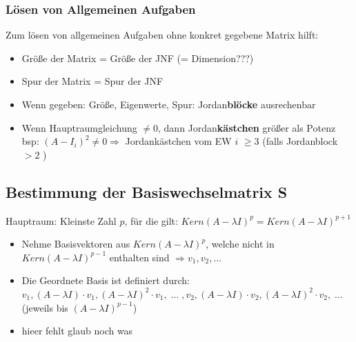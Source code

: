 \documentclass[a4paper,portrait]{scrartcl}
\begin{document}
\subsubsection*{Lösen von Allgemeinen Aufgaben}
Zum lösen von allgemeinen Aufgaben ohne konkret gegebene Matrix hilft:
\begin{itemize}
	\item Größe der Matrix = Größe der JNF (= Dimension???)
	\item Spur der Matrix = Spur der JNF
	\item Wenn gegeben: Größe, Eigenwerte, Spur: Jordan\textbf{blöcke} ausrechenbar
	\item Wenn Hauptraumgleichung $\neq 0$, dann Jordan\textbf{kästchen} größer als Potenz\\
		bsp: $(A-I_i)^2 \neq 0 \Rightarrow$ Jordankästchen vom EW $i$  $\geq 3$ (falls Jordanblock $>2$ )
\end{itemize}
\subsection{Bestimmung der Basiswechselmatrix S}
Hauptraum: Kleinste Zahl $p$, für die gilt: $Kern(A-\lambda I)^p = Kern(A-\lambda I)^{p+1}$\\

\begin{itemize}
	\item Nehme Basisvektoren aus $Kern(A-\lambda I)^p$, welche nicht in  $Kern(A-\lambda I)^{p-1}$ enthalten sind $\Rightarrow v_1, v_2, ...$
	\item Die Geordnete Basis ist definiert durch: \\
		$v_1, (A-\lambda I)\cdot v_1, (A-\lambda I)^2\cdot v_1,\; \hdots\; , v_2, (A-\lambda I)\cdot v_2, (A-\lambda I)^2\cdot v_2,\; \hdots$\\
		(jeweils bis $(A-\lambda I)^{p-1}$)
	\item hieer fehlt glaub noch was
\end{itemize}
\end{document}
